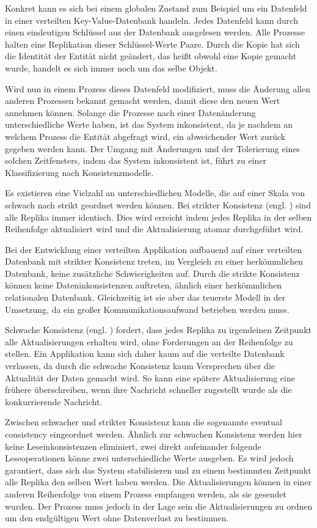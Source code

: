 Konkret kann es sich bei einem globalen Zustand zum Beispiel um ein Datenfeld in einer verteilten Key-Value-Datenbank handeln.
Jedes Datenfeld kann durch einen eindeutigen Schlüssel aus der Datenbank ausgelesen werden.
Alle Prozesse halten eine Replikation dieser Schlüssel-Werte Paare.
Durch die Kopie hat sich die Identität der Entität nicht geändert, das heißt obwohl eine Kopie gemacht wurde, handelt es sich immer noch um das selbe Objekt.

Wird nun in einem Prozess dieses Datenfeld modifiziert, muss die Änderung allen anderen Prozessen bekannt gemacht werden, damit diese den neuen Wert annehmen können.
Solange die Prozesse nach einer Datenänderung unterschiedliche Werte haben, ist das System inkonsistent, da je nachdem an welchem Prozess die Entität abgefragt wird, ein abweichender Wert zurück gegeben werden kann.
Der Umgang mit Änderungen und der Tolerierung eines solchen Zeitfensters, indem das System inkonsistent ist, führt zu einer Klassifizierung nach Konsistenzmodelle.

Es existieren eine Vielzahl an unterschiedlichen Modelle, die auf einer Skala von schwach nach strikt geordnet werden können.
Bei strikter Konsistenz (engl. ) sind alle Replika immer identisch. Dies wird erreicht indem jedes Replika in der selben Reihenfolge aktualisiert wird und die Aktualisierung atomar durchgeführt wird.

Bei der Entwicklung einer verteilten Applikation aufbauend auf einer verteilten Datenbank mit strikter Konsistenz treten, im Vergleich zu einer herkömmlichen Datenbank, keine zusätzliche Schwierigkeiten auf.
Durch die strikte Konsistenz können keine Dateninkonsistenzen auftreten, ähnlich einer herkömmlichen relationalen Datenbank.
Gleichzeitig ist sie aber das teuerste Modell in der Umsetzung, da ein großer Kommunikationsaufwand betrieben werden muss.

Schwache Konsistenz (engl. ) fordert, dass jedes Replika zu irgendeinen Zeitpunkt alle Aktualisierungen erhalten wird, ohne Forderungen an der Reihenfolge zu stellen.
Ein Applikation kann sich daher kaum auf die verteilte Datenbank verlassen, da durch die schwache Konsistenz kaum Versprechen über die Aktualität der Daten gemacht wird.
So kann eine spätere Aktualisierung eine frühere überschreiben, wenn ihre Nachricht schneller zugestellt wurde als die konkurrierende Nachricht.

Zwischen schwacher und strikter Konsistenz kann die sogenannte eventual consistency eingeordnet werden.
Ähnlich zur schwachen Konsistenz werden hier keine Leseinkonsistenzen eliminiert, zwei direkt aufeinander folgende Leseoperationen könne zwei unterschiedliche Werte ausgeben.
Es wird jedoch garantiert, dass sich das System stabilisieren und zu einem bestimmten Zeitpunkt alle Replika den selben Wert haben werden.
Die Aktualisierungen können in einer anderen Reihenfolge von einem Prozess empfangen werden, als sie gesendet wurden.
Der Prozess muss jedoch in der Lage sein die Aktualisierungen zu ordnen um den endgültigen Wert ohne Datenverlust zu bestimmen.

